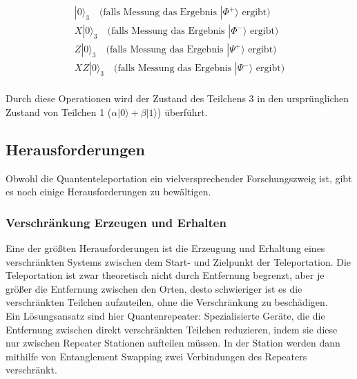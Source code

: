 \begin{gather*}
    |0\rangle_3 \quad \text{(falls Messung das Ergebnis } |\Phi^+\rangle\text{ ergibt)}\\
    X|0\rangle_3 \quad \text{(falls Messung das Ergebnis } |\Phi^-\rangle\text{ ergibt)}\\
    Z|0\rangle_3 \quad \text{(falls Messung das Ergebnis } |\Psi^+\rangle\text{ ergibt)}\\
    XZ|0\rangle_3 \quad \text{(falls Messung das Ergebnis } |\Psi^-\rangle\text{ ergibt)}\\
\end{gather*}

Durch diese Operationen wird der Zustand des Teilchens 3 in den ursprünglichen Zustand von Teilchen 1 (\( \alpha |0\rangle + \beta |1\rangle \)) überführt.


\subsection{Herausforderungen}\label{subsec:challenges}
Obwohl die Quantenteleportation ein vielversprechender Forschungszweig ist, gibt es noch einige Herausforderungen zu bewältigen.

\subsubsection{Verschränkung Erzeugen und Erhalten}
Eine der größten Herausforderungen ist die Erzeugung und Erhaltung eines verschränkten Systems zwischen dem Start- und Zielpunkt
der Teleportation.
Die Teleportation ist zwar theoretisch nicht durch Entfernung begrenzt, aber je größer die Entfernung zwischen den Orten,
desto schwieriger ist es die verschränkten Teilchen aufzuteilen, ohne die Verschränkung zu beschädigen.\\

Ein Lösungsansatz sind hier Quantenrepeater: Spezialisierte Geräte, die die Entfernung zwischen direkt verschränkten Teilchen reduzieren,
indem sie diese nur zwischen Repeater Stationen aufteilen müssen.
In der Station werden dann mithilfe von Entanglement Swapping zwei Verbindungen des Repeaters verschränkt.

